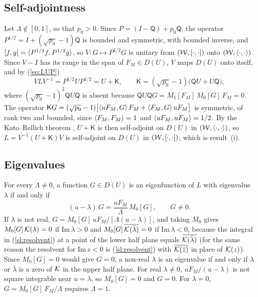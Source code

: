 \subsection{Self-adjointness}\label{appB:sa}

Let $\Lambda\notin[0,1]$, so that $p_0>0$. Since $P=(I-\mathsf Q)+p_0\mathsf Q$, the operator $P^{1/2}=I+(\sqrt{p_0}-1)\mathsf Q$ is bounded and symmetric, with bounded inverse, and $[f,g]=\langle P^{1/2}f,P^{1/2}g\rangle$, so $V:G\mapsto P^{1/2}G$ is unitary from $(\mathcal W,[\cdot,\cdot])$ onto $(\mathcal W,\langle \cdot,\cdot\rangle)$. Since $V-I$ has its range in the span of $F_M\in D(U)$, $V$ maps $D(U)$ onto itself, and by (\ref{eq:LUP})
\begin{equation}\label{appB:rank2}
  VLV^{-1}=P^{1/2}UP^{1/2}=U+\mathsf K,\qquad
  \mathsf K=(\sqrt{p_0}-1)\big(\mathsf QU+U\mathsf Q\big),
\end{equation}
where $(\sqrt{p_0}-1)^2\mathsf QU\mathsf Q$ is absent because $\mathsf QU\mathsf QG=M_1[F_M]\,M_0[G]\,F_M=0$. The operator $\mathsf KG=(\sqrt{p_0}-1)\big[\langle uF_M,G\rangle\,F_M+\langle F_M,G\rangle\,uF_M\big]$ is symmetric, of rank two and bounded, since $\langle F_M,F_M\rangle=1$ and $\langle uF_M,uF_M\rangle=1/2$. By the Kato--Rellich theorem \citep[][chapter~V]{Kato1966}, $U+\mathsf K$ is then self-adjoint on $D(U)$ in $(\mathcal W,\langle \cdot,\cdot\rangle)$, so $L=V^{-1}(U+\mathsf K)V$ is self-adjoint on $D(U)$ in $(\mathcal W,[\cdot,\cdot])$, which is result~(i).

\subsection{Eigenvalues}\label{appB:eig}

For every $\Lambda\neq0$, a function $G\in D(U)$ is an eigenfunction of $L$ with eigenvalue $\lambda$ if and only if
\begin{equation*}
  (u-\lambda)\,G=\frac{uF_M}{\Lambda}\,M_0[G],\qquad G\neq0 .
\end{equation*}
If $\lambda$ is not real, $G=M_0[G]\,uF_M/[\Lambda(u-\lambda)]$, and taking $M_0$ gives $M_0[G]\,\mathcal K(\lambda)=0$ if $\mathrm{Im}\,\lambda>0$ and $M_0[G]\,\overline{\mathcal K(\bar\lambda)}=0$ if $\mathrm{Im}\,\lambda<0$, because the integral in (\ref{sl:resolvent}) at a point of the lower half plane equals $\overline{\mathcal K(\bar\lambda)}$ (for the same reason the resolvent for $\mathrm{Im}\,z<0$ is (\ref{sl:resolvent}) with $\overline{\mathcal K(\bar z)}$ in place of $\mathcal K(z)$). Since $M_0[G]=0$ would give $G=0$, a non-real $\lambda$ is an eigenvalue if and only if $\lambda$ or $\bar\lambda$ is a zero of $\mathcal K$ in the upper half plane. For real $\lambda\neq0$, $uF_M/(u-\lambda)$ is not square integrable near $u=\lambda$, so $M_0[G]=0$ and $G=0$. For $\lambda=0$, $G=M_0[G]\,F_M/\Lambda$ requires $\Lambda=1$.

